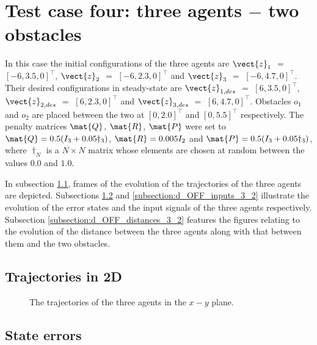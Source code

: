\section{Test case four: three agents $-$ two obstacles}

In this case the initial configurations of the three agents are
$\vect{z}_1$ $=$ $[-6, 3.5, 0]^{\top}$,
$\vect{z}_2$ $=$ $[-6, 2.3, 0]^{\top}$ and
$\vect{z}_3$ $=$ $[-6, 4.7, 0]^{\top}$.
Their desired configurations in steady-state are
$\vect{z}_{1,des}$ $=$ $[6, 3.5, 0]^{\top}$,
$\vect{z}_{2,des}$ $=$ $[6, 2.3, 0]^{\top}$ and
$\vect{z}_{3,des}$ $=$ $[6, 4.7, 0]^{\top}$.
Obstacles $o_1$ and $o_2$ are placed between the two at $[0, 2.0]^{\top}$
and $[0, 5.5]^{\top}$ respectively. The penalty
matrices $\mat{Q}$, $\mat{R}$, $\mat{P}$ were set to
$\mat{Q} = 0.5 (I_3 + 0.05\dagger_3)$, $\mat{R} = 0.005 I_2$ and
$\mat{P} = 0.5 (I_3 + 0.05\dagger_3)$, where $\dagger_N$ is a $N \times N$
matrix whose elements are chosen at random between the values $0.0$ and $1.0$.

In subsection \ref{subsection:d_OFF_trajectories_3_2}, frames of the evolution of the
trajectories of the three agents are depicted. Subsections
\ref{subsection:d_OFF_errors_3_2} and \ref{subsection:d_OFF_inputs_3_2} illustrate
the evolution of the error states and the input signals of the three agents
respectively. Subsection \ref{subsection:d_OFF_distances_3_2} features the
figures relating to the evolution of the distance between the three agents
along with that between them and the two obstacles.


\subsection{Trajectories in 2D}
\label{subsection:d_OFF_trajectories_3_2}

\begin{figure}[H]
  
  \caption{The trajectories of the three agents in the $x-y$ plane.}
  \label{fig:d_OFF_trajectory_3_2}
\end{figure}



\subsection{State errors}
\label{subsection:d_OFF_errors_3_2}

